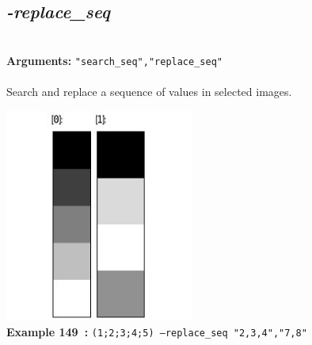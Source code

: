 \documentclass[a4paper,11pt,twoside]{book}
\begin{document}
\subsection{\emph{-replace\_seq} }\vspace*{-0.5em}
~\\\textbf{Arguments: } 
{\small \texttt{"search\_seq","replace\_seq"}}\\~\\
Search and replace a sequence of values in selected images.
\begin{center}\includegraphics[keepaspectratio=true,height=7cm,width=\textwidth]{img/gmic_def149.jpg}\\
{\footnotesize \textbf{Example 149~:} \texttt{(1;2;3;4;5) --replace\_seq "2,3,4","7,8"}}
\end{center}
\end{document}
